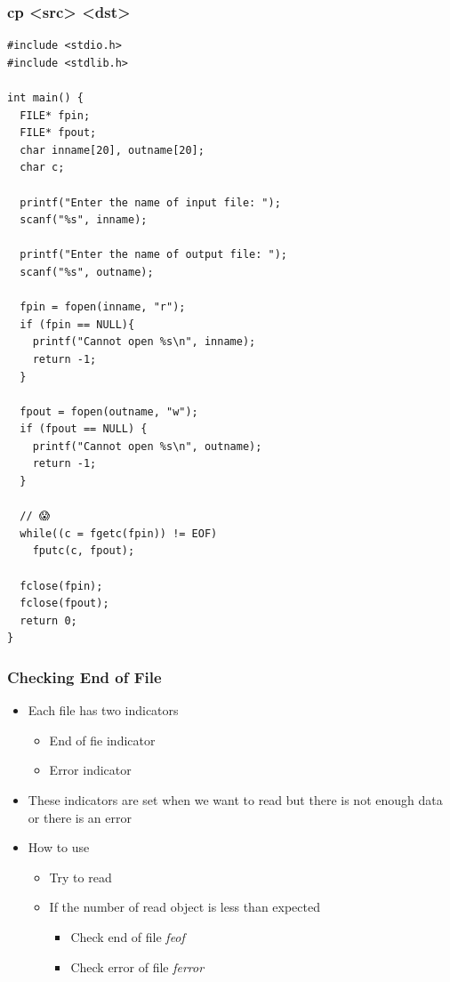 \documentclass{../c-lecture}
\begin{document}
\begin{frame}[fragile]
  \frametitle{cp <src> <dst>}
  \scriptsize
  \begin{verbatim}
#include <stdio.h>
#include <stdlib.h>

int main() {
  FILE* fpin;
  FILE* fpout;
  char inname[20], outname[20];
  char c;

  printf("Enter the name of input file: ");
  scanf("%s", inname);

  printf("Enter the name of output file: ");
  scanf("%s", outname);

  fpin = fopen(inname, "r");
  if (fpin == NULL){
    printf("Cannot open %s\n", inname);
    return -1;
  }

  fpout = fopen(outname, "w");
  if (fpout == NULL) {
    printf("Cannot open %s\n", outname);
    return -1;
  }

  // 😱
  while((c = fgetc(fpin)) != EOF)
    fputc(c, fpout);

  fclose(fpin);
  fclose(fpout);
  return 0;
}
  \end{verbatim}
\end{frame}

\begin{frame}
  \frametitle{Checking End of File}
  \begin{itemize}
    \item Each file has two indicators
    \begin{itemize}
      \item End of fie indicator
      \item Error indicator
    \end{itemize}
    \item
      These indicators are set when we want to read but there is not enough
      data or there is an error
    \item How to use
    \begin{itemize}
      \item Try to read
      \item If the number of read object is less than expected
      \begin{itemize}
        \item Check end of file \textrightarrow \textit{\color{YellowOrange} feof}
        \item Check error of file \textrightarrow \textit{\color{LimeGreen} ferror}
      \end{itemize}
    \end{itemize}
  \end{itemize}
\end{frame}
\end{document}
